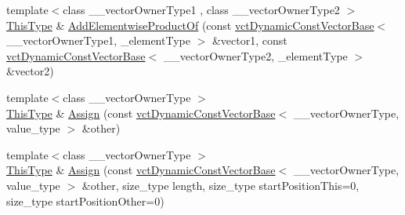 \begin{DoxyCompactItemize}
\item 
{\footnotesize template$<$class \-\_\-\-\_\-vector\-Owner\-Type1 , class \-\_\-\-\_\-vector\-Owner\-Type2 $>$ }\\\hyperlink{classvct_dynamic_const_vector_base_a39da273523717f678f54d3321ebca3dd}{This\-Type} \& \hyperlink{classvct_dynamic_vector_base_af6ce0db0da09b89aff853c3029ec90e1}{Add\-Elementwise\-Product\-Of} (const \hyperlink{classvct_dynamic_const_vector_base}{vct\-Dynamic\-Const\-Vector\-Base}$<$ \-\_\-\-\_\-vector\-Owner\-Type1, \-\_\-element\-Type $>$ \&vector1, const \hyperlink{classvct_dynamic_const_vector_base}{vct\-Dynamic\-Const\-Vector\-Base}$<$ \-\_\-\-\_\-vector\-Owner\-Type2, \-\_\-element\-Type $>$ \&vector2)
\end{DoxyCompactItemize}
{\bf }\par
\begin{DoxyCompactItemize}
\item 
{\footnotesize template$<$class \-\_\-\-\_\-vector\-Owner\-Type $>$ }\\\hyperlink{classvct_dynamic_const_vector_base_a39da273523717f678f54d3321ebca3dd}{This\-Type} \& \hyperlink{classvct_dynamic_vector_base_a0d174f0a9557fd562de13324c14e0b92}{Assign} (const \hyperlink{classvct_dynamic_const_vector_base}{vct\-Dynamic\-Const\-Vector\-Base}$<$ \-\_\-\-\_\-vector\-Owner\-Type, value\-\_\-type $>$ \&other)
\end{DoxyCompactItemize}

{\bf }\par
\begin{DoxyCompactItemize}
\item 
{\footnotesize template$<$class \-\_\-\-\_\-vector\-Owner\-Type $>$ }\\\hyperlink{classvct_dynamic_const_vector_base_a39da273523717f678f54d3321ebca3dd}{This\-Type} \& \hyperlink{classvct_dynamic_vector_base_acec7a6bf6e8e611b45dc7c3553ad72d6}{Assign} (const \hyperlink{classvct_dynamic_const_vector_base}{vct\-Dynamic\-Const\-Vector\-Base}$<$ \-\_\-\-\_\-vector\-Owner\-Type, value\-\_\-type $>$ \&other, size\-\_\-type length, size\-\_\-type start\-Position\-This=0, size\-\_\-type start\-Position\-Other=0)
\end{DoxyCompactItemize}

